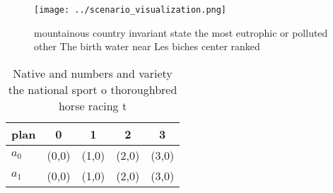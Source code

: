 \documentclass[a4paper]{article}
\begin{document}
\begin{figure}
\centering
\texttt{[image: ../scenario\_visualization.png]}
\caption{mountainous country invariant state the most eutrophic or polluted other The birth water near Les biches center ranked 
}
\end{figure}
 
\begin{table}
\begin{adjustbox}{width=0.5\columnwidth}
\begin{tabular}{|l|l|l|l|l|}
\hline
\textbf{plan} & \multicolumn{1}{c|}{\textbf{0}} & \multicolumn{1}{c|}{\textbf{1}} & \multicolumn{1}{c|}{\textbf{2}} & \multicolumn{1}{c|}{\textbf{3}} \\ \hline
\textbf{$a_0$}  & (0,0) & (1,0) & (2,0) & (3,0) \\ \hline
\textbf{$a_1$}  & (0,0) & (1,0) & (2,0) & (3,0) \\ \hline
\end{tabular}
\end{adjustbox}
\caption{Native and numbers and variety the national sport o thoroughbred horse racing t
}
\end{table}
\end{document}
